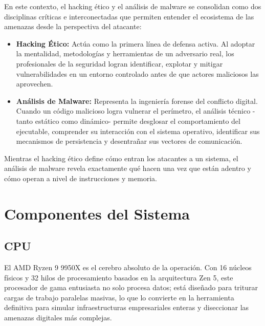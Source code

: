 \documentclass[12pt, a4paper]{article}
\begin{document}
En este contexto, el hacking ético y el análisis de malware se consolidan como dos disciplinas críticas e interconectadas que permiten entender el ecosistema de las amenazas desde la perspectiva del atacante:

\begin{itemize}
    \item \textbf{Hacking Ético:} Actúa como la primera línea de defensa activa. Al adoptar la mentalidad, metodologías y herramientas de un adversario real, los profesionales de la seguridad logran identificar, explotar y mitigar vulnerabilidades en un entorno controlado antes de que actores maliciosos las aprovechen.
    
    \item \textbf{Análisis de Malware:} Representa la ingeniería forense del conflicto digital. Cuando un código malicioso logra vulnerar el perímetro, el análisis técnico -tanto estático como dinámico- permite desglosar el comportamiento del ejecutable, comprender su interacción con el sistema operativo, identificar sus mecanismos de persistencia y desentrañar sus vectores de comunicación.
\end{itemize}

Mientras el hacking ético define cómo entran los atacantes a un sistema, el análisis de malware revela exactamente qué hacen una vez que están adentro y cómo operan a nivel de instrucciones y memoria.

\newpage
\section*{Componentes del Sistema}

\subsection*{CPU}
El AMD Ryzen 9 9950X es el cerebro absoluto de la operación. Con 16 núcleos físicos y 32 hilos de procesamiento basados en la arquitectura Zen 5, este procesador de gama entusiasta no solo procesa datos; está diseñado para triturar cargas de trabajo paralelas masivas, lo que lo convierte en la herramienta definitiva para simular infraestructuras empresariales enteras y diseccionar las amenazas digitales más complejas.
\end{document}
